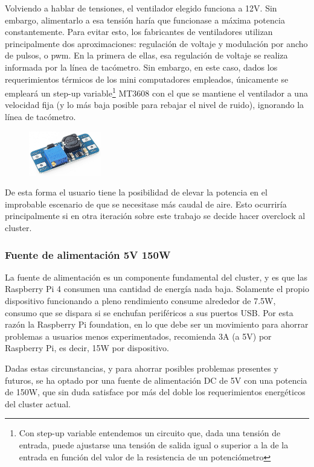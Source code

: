 Volviendo a hablar de tensiones, el ventilador elegido funciona a 12V. Sin embargo, alimentarlo a esa tensión haría que funcionase a máxima potencia constantemente. Para evitar esto, los fabricantes de ventiladores utilizan principalmente dos aproximaciones: regulación de voltaje y modulación por ancho de pulsos, o \acrshort{pwm}. En la primera de ellas, esa regulación de voltaje se realiza informada por la línea de tacómetro. Sin embargo, en este caso,  dados los requerimientos térmicos de los mini computadores empleados, únicamente se empleará un step-up variable\footnote{Con step-up variable entendemos un circuito que, dada una tensión de entrada, puede ajustarse una tensión de salida igual o superior a la de la entrada en función del valor de la resistencia de un potenciómetro} MT3608 con el que se mantiene el ventilador a una velocidad fija (y lo más baja posible para rebajar el nivel de ruido), ignorando la línea de tacómetro.\begin{figure}
  \centering
  \includegraphics[width=0.28\textwidth]{img/step-up.jpg}
  \label{fig:step-up}
\end{figure}De esta forma el usuario tiene la posibilidad de elevar la potencia en el improbable escenario de que se necesitase más caudal de aire. Esto ocurriría principalmente si en otra iteración sobre este trabajo se decide hacer overclock al cluster.

\subsubsection{Fuente de alimentación 5V 150W}
La fuente de alimentación es un componente fundamental del cluster, y es que las Raspberry Pi 4 consumen una cantidad de energía nada baja. Solamente el propio dispositivo funcionando a pleno rendimiento consume alrededor de 7.5W, consumo que se dispara si se enchufan periféricos a sus puertos USB. Por esta razón la Raspberry Pi foundation, en lo que debe ser un movimiento para ahorrar problemas a usuarios menos experimentados, recomienda 3A (a 5V) por Raspberry Pi, es decir, 15W por dispositivo.\cite{raspberrypi_power-requirements}

Dadas estas circunstancias, y para ahorrar posibles problemas presentes y futuros, se ha optado por una fuente de alimentación DC de 5V con una potencia de 150W, que sin duda satisface por más del doble los requerimientos energéticos del cluster actual.


